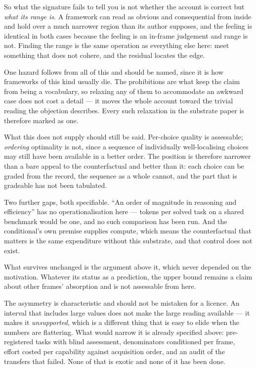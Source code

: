 \documentclass[11pt,a4paper]{article}
\theoremstyle{remark}\newtheorem{remark}[definition]{Remark}
\begin{document}
So what the signature fails to tell you is not whether the account is correct but \emph{what its range
is}. A framework can read as obvious and consequential from inside and hold over a much narrower region
than its author supposes, and the feeling is identical in both cases because the feeling is an in-frame
judgement and range is not. Finding the range is the same operation as everything else here: meet
something that does not cohere, and the residual locates the edge.

One hazard follows from all of this and should be named, since it is how frameworks of this kind
usually die. The prohibitions are what keep the claim from being a vocabulary, so relaxing any of them
to accommodate an awkward case does not cost a detail --- it moves the whole account toward the trivial
reading the objection describes. Every such relaxation in the substrate paper is therefore marked as one.

What this does not supply should still be said. Per-choice quality is assessable; \emph{ordering}
optimality is not, since a sequence of individually well-localising choices may still have been
available in a better order. The position is therefore narrower than a bare appeal to the
counterfactual and better than it: each choice can be graded from the record, the sequence as a whole
cannot, and the part that is gradeable has not been tabulated.

Two further gaps, both specifiable. ``An order of magnitude in reasoning and efficiency'' has no
operationalisation here --- tokens per solved task on a shared benchmark would be one, and no such
comparison has been run. And the conditional's own premise supplies compute, which means the
counterfactual that matters is the same expenditure without this substrate, and that control does not
exist.

What survives unchanged is the argument above it, which never depended on the motivation. Whatever its
status as a prediction, the upper bound remains a claim about other frames' absorption and is not
assessable from here.

The asymmetry is characteristic and should not be mistaken for a licence. An interval that includes
large values does not make the large reading available --- it makes it \emph{unsupported}, which is a
different thing that is easy to elide when the numbers are flattering. What would narrow it is already
specified above: pre-registered tasks with blind assessment, denominators conditioned per frame, effort
costed per capability against acquisition order, and an audit of the transfers that failed. None of
that is exotic and none of it has been done.
\end{document}
